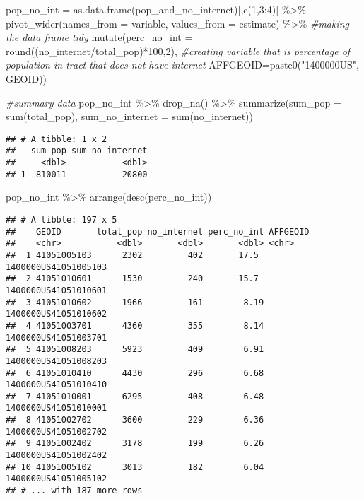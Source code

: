 \documentclass[
]{article}
\newenvironment{Shaded}{\begin{snugshade}}{\end{snugshade}}
\newcommand{\AttributeTok}[1]{\textcolor[rgb]{0.77,0.63,0.00}{#1}}
\newcommand{\CommentTok}[1]{\textcolor[rgb]{0.56,0.35,0.01}{\textit{#1}}}
\newcommand{\DecValTok}[1]{\textcolor[rgb]{0.00,0.00,0.81}{#1}}
\newcommand{\FunctionTok}[1]{\textcolor[rgb]{0.00,0.00,0.00}{#1}}
\newcommand{\NormalTok}[1]{#1}
\newcommand{\OtherTok}[1]{\textcolor[rgb]{0.56,0.35,0.01}{#1}}
\newcommand{\SpecialCharTok}[1]{\textcolor[rgb]{0.00,0.00,0.00}{#1}}
\newcommand{\StringTok}[1]{\textcolor[rgb]{0.31,0.60,0.02}{#1}}
\begin{document}
\begin{Shaded}
\begin{Highlighting}[]
\NormalTok{pop\_no\_int }\OtherTok{=} \FunctionTok{as.data.frame}\NormalTok{(pop\_and\_no\_internet)[,}\FunctionTok{c}\NormalTok{(}\DecValTok{1}\NormalTok{,}\DecValTok{3}\SpecialCharTok{:}\DecValTok{4}\NormalTok{)] }\SpecialCharTok{\%\textgreater{}\%} 
    \FunctionTok{pivot\_wider}\NormalTok{(}\AttributeTok{names\_from =}\NormalTok{ variable, }\AttributeTok{values\_from =}\NormalTok{ estimate) }\SpecialCharTok{\%\textgreater{}\%} \CommentTok{\#making the data frame tidy }
      \FunctionTok{mutate}\NormalTok{(}\AttributeTok{perc\_no\_int =} \FunctionTok{round}\NormalTok{((no\_internet}\SpecialCharTok{/}\NormalTok{total\_pop)}\SpecialCharTok{*}\DecValTok{100}\NormalTok{,}\DecValTok{2}\NormalTok{), }\CommentTok{\#creating variable that is percentage of population in tract that does not have internet}
              \AttributeTok{AFFGEOID=}\FunctionTok{paste0}\NormalTok{(}\StringTok{"1400000US"}\NormalTok{, GEOID))}

\CommentTok{\#summary data }
\NormalTok{pop\_no\_int }\SpecialCharTok{\%\textgreater{}\%} \FunctionTok{drop\_na}\NormalTok{() }\SpecialCharTok{\%\textgreater{}\%} \FunctionTok{summarize}\NormalTok{(}\AttributeTok{sum\_pop =} \FunctionTok{sum}\NormalTok{(total\_pop), }\AttributeTok{sum\_no\_internet =} \FunctionTok{sum}\NormalTok{(no\_internet))}
\end{Highlighting}
\end{Shaded}

\begin{verbatim}
## # A tibble: 1 x 2
##   sum_pop sum_no_internet
##     <dbl>           <dbl>
## 1  810011           20800
\end{verbatim}

\begin{Shaded}
\begin{Highlighting}[]
\NormalTok{pop\_no\_int }\SpecialCharTok{\%\textgreater{}\%} \FunctionTok{arrange}\NormalTok{(}\FunctionTok{desc}\NormalTok{(perc\_no\_int))}
\end{Highlighting}
\end{Shaded}

\begin{verbatim}
## # A tibble: 197 x 5
##    GEOID       total_pop no_internet perc_no_int AFFGEOID            
##    <chr>           <dbl>       <dbl>       <dbl> <chr>               
##  1 41051005103      2302         402       17.5  1400000US41051005103
##  2 41051010601      1530         240       15.7  1400000US41051010601
##  3 41051010602      1966         161        8.19 1400000US41051010602
##  4 41051003701      4360         355        8.14 1400000US41051003701
##  5 41051008203      5923         409        6.91 1400000US41051008203
##  6 41051010410      4430         296        6.68 1400000US41051010410
##  7 41051010001      6295         408        6.48 1400000US41051010001
##  8 41051002702      3600         229        6.36 1400000US41051002702
##  9 41051002402      3178         199        6.26 1400000US41051002402
## 10 41051005102      3013         182        6.04 1400000US41051005102
## # ... with 187 more rows
\end{verbatim}
\end{document}
